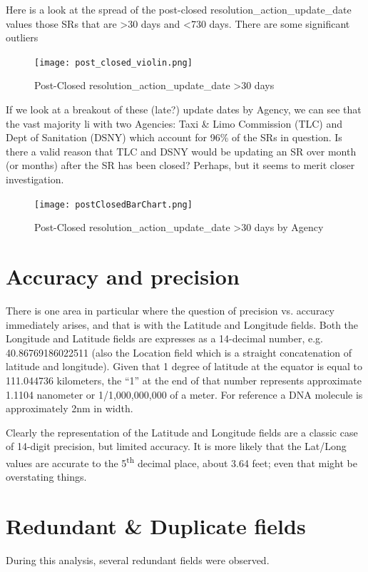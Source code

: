 \documentclass[12pt, titlepage]{article}
\begin{document}
	Here is a look at the spread of the post-closed resolution\_action\_update\_date values those SRs 
	that are \textgreater{}30 days and \textless{}730 days. There are some significant outliers 
	
	\begin{figure}[H]
		 \centering
		 \texttt{[image: post\_closed\_violin.png]}
		 \caption{Post-Closed resolution\_action\_update\_date >30 days }
		 \label{fig:resolution-violin}
	\end{figure}		

	If we look at a breakout of these (late?) update dates by Agency, we can see that the vast majority li with two
	Agencies: Taxi \& Limo Commission (TLC) and Dept of Sanitation (DSNY) which account for 96\% of the SRs in
	question.  Is there a valid reason that TLC and DSNY would be updating an SR over month (or months) after
	the SR has been closed? Perhaps, but it seems to merit closer investigation. 

	\begin{figure}[H]
		 \centering
		 \texttt{[image: postClosedBarChart.png]}
		 \caption{Post-Closed resolution\_action\_update\_date >30 days by Agency }
		 \label{fig:resolution-by-agency}
	\end{figure}		

\section{Accuracy and precision}\label{sec:precision}
There is one area in particular where the question of precision vs. accuracy immediately arises, and that is with the Latitude and Longitude fields.  Both the 
Longitude and Latitude fields are expresses as a 14-decimal number, e.g. 40.86769186022511 (also the Location field which is a straight concatenation of
latitude and longitude). Given that 1 degree of latitude at the equator is equal to 111.044736 kilometers, the ``1'' at the end of that number represents
approximate 1.1104 nanometer or 1/1,000,000,000 of a meter. For reference a DNA molecule is approximately 2nm in width. 

Clearly the representation of the Latitude and Longitude fields are a classic case of 14-digit precision, 
but limited accuracy. It is more likely that the Lat/Long values are accurate to the 5\textsuperscript{th} decimal place, about 3.64 feet; even that might be
overstating things. 



\section{Redundant \& Duplicate fields}\label{sec:duplicates}
During this analysis, several redundant fields were observed.
\end{document}
